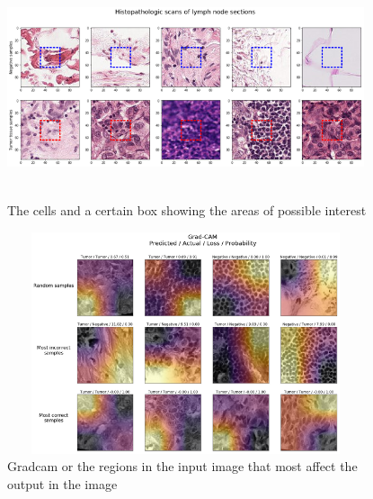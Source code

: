 \documentclass[19pt]{article}
\begin{document}
\begin{center}
    \begin{figure}[!h!t!b]
        \centerline{\includegraphics[width=105mm,height=65mm]{images/metastases.png}}
        \caption{The cells and a certain box showing the areas of possible interest}
        \label{fig:2}
    \end{figure}
\end{center}

\begin{center}
    \begin{figure}[!h!t!b]
        \centerline{\includegraphics[width=105mm,height=65mm]{images/gradcam.png}}
        \caption{Gradcam or the regions in the input image that most affect the output in the image}
        \label{fig:3}
    \end{figure}
\end{center}

\newpage
  



\end{document}
